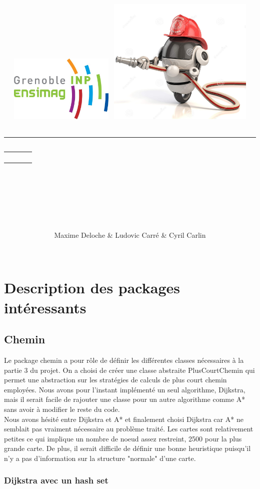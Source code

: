 \documentclass[12pt,a4paper]{article}
\title{
	\begin{flushleft}
		\includegraphics[width=5cm]{rapport/logo_ensimag.jpg} \hfill
		\includegraphics[width=7cm]{rapport/firebot.jpg} \\[40pt]
	\end{flushleft} 
	{\rule{15cm}{1mm}}\vspace{7mm}
	\begin{tabular}{p{4cm} r}
		& {\Huge {\bf \typedeprojet}} \\[20pt]
		& {\huge \nomduprojet}
	\end{tabular}\\
	\vspace{7mm}{\rule{15cm}{1mm}}\vspace{2mm} \\
	\hfill \large \dateduprojet \hspace{2cm}
	\renewcommand{\contentsname}{\LARGE \it Sommaire \hfill} %
	\setcounter{tocdepth}{2} %
	\tableofcontents
	\vfill
}
\author{
	\begin{tabular}{p{15cm}}
		\Large Maxime Deloche \& Ludovic Carré \& Cyril Carlin
	\end{tabular} \\
	\hline
}
\date{}
\begin{document}
\maketitle
\thispagestyle{empty} %
\newpage



\section{Description des packages intéressants}

\subsection{Chemin}

Le package chemin a pour rôle de définir les différentes classes nécessaires à la partie 3 du projet. On a choisi de créer une classe abstraite PlusCourtChemin qui permet une abstraction sur les stratégies de calculs de plus court chemin employées. Nous avons pour l'instant implémenté un seul algorithme, Dijkstra, mais il serait facile de rajouter une classe pour un autre algorithme comme A* sans avoir à modifier le reste du code.\\

Nous avons hésité entre Dijkstra et A* et finalement choisi Dijkstra car A* ne semblait pas vraiment nécessaire au problème traité. Les cartes sont relativement petites ce qui implique un nombre de noeud assez restreint, 2500 pour la plus grande carte. De plus, il serait difficile de définir une bonne heuristique puisqu'il n'y a pas d'information sur la structure "normale" d'une carte.

\subsubsection{Dijkstra avec un hash set}
\end{document}
